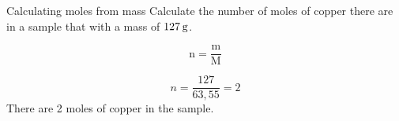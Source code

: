       \noindent
      \begin{wex}{Calculating moles from mass }{
\label{m38717*probfhsst!!!underscore!!!id410}
      \label{m38717*id277635}Calculate the number of moles of copper there are in a sample that with a mass of $127\phantom{\rule{2pt}{0ex}}\text{g}$. 
      \vspace{5pt}}
{
      \label{m38717*id277680}\nopagebreak\noindent{}
        
    \begin{equation*}
    \text{n}=\frac{\text{m}}{\text{M}}
      \end{equation*}
      \item  
      \label{m38717*id277705}\nopagebreak\noindent{}
        
    \begin{equation*}
    n=\frac{127}{63,55}=2
      \end{equation*}
      \label{m38717*id277735}There are 2 moles of copper in the sample.
}
    \end{wex}
    
